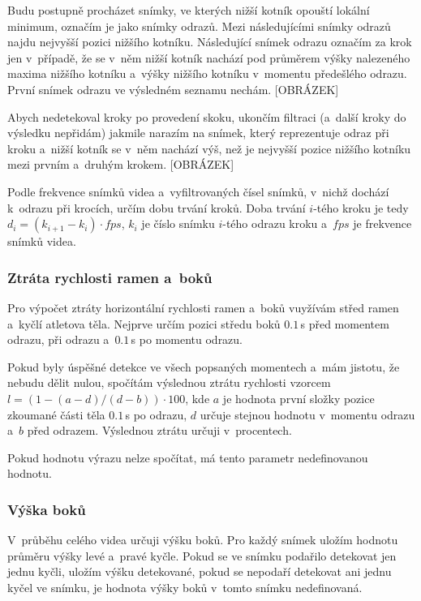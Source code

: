 Budu postupně procházet snímky, ve kterých nižší kotník opouští lokální minimum, označím je jako snímky odrazů. Mezi následujícími snímky odrazů najdu nejvyšší pozici nižšího kotníku. Následující snímek odrazu označím za krok jen v~případě, že se v~něm nižší kotník nachází pod průměrem výšky nalezeného maxima nižšího kotníku a~výšky nižšího kotníku v~momentu předešlého odrazu. První snímek odrazu ve výsledném seznamu nechám. [OBRÁZEK]

Abych nedetekoval kroky po provedení skoku, ukončím filtraci (a~další kroky do výsledku nepřidám) jakmile narazím na snímek, který reprezentuje odraz při kroku a~nižší kotník se v~něm nachází výš, než je nejvyšší pozice nižšího kotníku mezi prvním a~druhým krokem. [OBRÁZEK]

Podle frekvence snímků videa a~vyfiltrovaných čísel snímků, v~nichž dochází k~odrazu při krocích, určím dobu trvání kroků. Doba trvání $i$-tého kroku je tedy $d_i=(k_{i+1}-k_i)\cdot fps$, $k_i$ je číslo snímku $i$-tého odrazu kroku a~$fps$ je frekvence snímků videa.


\subsubsection{Ztráta rychlosti ramen a~boků}

Pro výpočet ztráty horizontální rychlosti ramen a~boků vuyžívám střed ramen a~kyčlí atletova těla. Nejprve určím pozici středu boků $0.1$\,\rm s před momentem odrazu, při odrazu a~$0.1$\,\rm s po momentu odrazu.

Pokud byly úspěšné detekce ve všech popsaných momentech a~mám jistotu, že nebudu dělit nulou, spočítám výslednou ztrátu rychlosti vzorcem $l=(1-(a-d)/(d-b))\cdot100$, kde $a$ je hodnota první složky pozice zkoumané části těla $0.1$\,\rm s po odrazu, $d$ určuje stejnou hodnotu v~momentu odrazu a~$b$ před odrazem. Výslednou ztrátu určuji v~procentech.

Pokud hodnotu výrazu nelze spočítat, má tento parametr nedefinovanou hodnotu.


\subsubsection{Výška boků}

V~průběhu celého videa určuji výšku boků. Pro každý snímek uložím hodnotu průměru výšky levé a~pravé kyčle. Pokud se ve snímku podařilo detekovat jen jednu kyčli, uložím výšku detekované, pokud se nepodaří detekovat ani jednu kyčel ve snímku, je hodnota výšky boků v~tomto snímku nedefinovaná.


